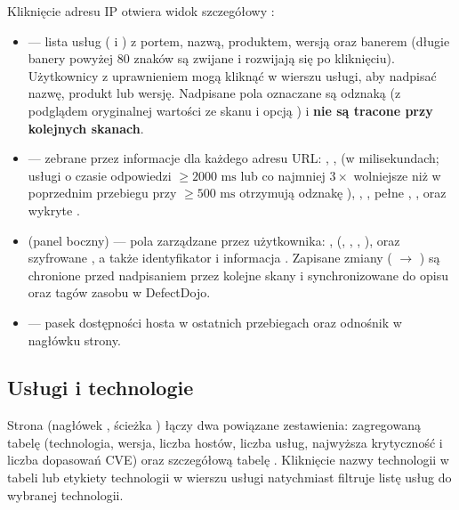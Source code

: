 \documentclass[10pt,a4paper]{article}
\begin{document}
Kliknięcie adresu IP otwiera widok szczegółowy :
\begin{itemize}
  \item {} --- lista usług ( i ) z portem, nazwą, produktem, wersją oraz banerem (długie banery powyżej 80 znaków są zwijane i rozwijają się po kliknięciu). Użytkownicy z uprawnieniem  mogą kliknąć  w wierszu usługi, aby nadpisać nazwę, produkt lub wersję. Nadpisane pola oznaczane są odznaką  (z podglądem oryginalnej wartości ze skanu i opcją ) i \textbf{nie są tracone przy kolejnych skanach}.
  \item {} --- zebrane przez  informacje dla każdego adresu URL: , ,  (w milisekundach; usługi o czasie odpowiedzi $\ge 2000\text{ ms}$ lub co najmniej $3\times$ wolniejsze niż w poprzednim przebiegu przy $\ge 500\text{ ms}$ otrzymują odznakę ), , , pełne , ,  oraz wykryte .
  \item {} (panel boczny) --- pola zarządzane przez użytkownika: ,  (, , , ),  oraz szyfrowane , a także identyfikator  i informacja . Zapisane zmiany ( $\rightarrow$ ) są chronione przed nadpisaniem przez kolejne skany i synchronizowane do opisu oraz tagów zasobu w DefectDojo.
  \item {} --- pasek dostępności hosta w ostatnich przebiegach oraz odnośnik  w nagłówku strony.
\end{itemize}


\subsection{Usługi i technologie}

Strona  (nagłówek , ścieżka ) łączy dwa powiązane zestawienia: zagregowaną tabelę  (technologia, wersja, liczba hostów, liczba usług, najwyższa krytyczność i liczba dopasowań CVE) oraz szczegółową tabelę . Kliknięcie nazwy technologii w tabeli lub etykiety technologii w wierszu usługi natychmiast filtruje listę usług do wybranej technologii.
\end{document}
